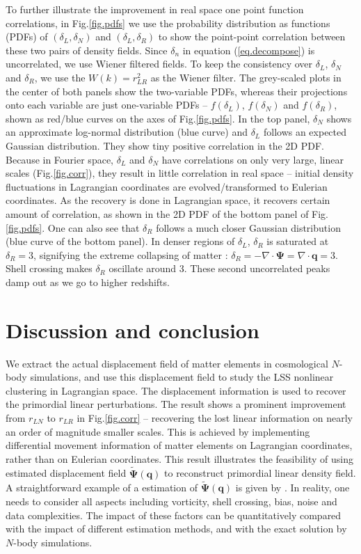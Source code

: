 \documentclass[aps,prd,twocolumn,superscriptaddress,amsfont,amssymb,amsmath,nofootinbib,showpacs,balancelastpage]{revtex4-1}
\newcommand{\bs}{\boldsymbol}
\begin{document}
To further illustrate the improvement in real space
one point function correlations,
in Fig.\ref{fig.pdfs} we use the probability distribution
as functions (PDFs) of $(\delta_L,\delta_N)$ and $(\delta_L,\delta_R)$
to show the point-point correlation between these two pairs of density
fields. Since $\delta_n$ in equation (\ref{eq.decompose}) is
uncorrelated, we use Wiener filtered fields. To keep the
consistency over $\delta_L$, $\delta_N$ and $\delta_R$, we
use the $W(k)=r^2_{LR}$ as the Wiener filter.
The grey-scaled plots in the center of both panels show the two-variable PDFs,
whereas their projections onto each variable are just
one-variable PDFs -- $f(\delta_L)$, $f(\delta_N)$ and $f(\delta_R)$, shown
as red/blue curves on the axes of Fig.\ref{fig.pdfs}.
In the top panel, $\delta_N$ shows an approximate log-normal
distribution (blue curve) and $\delta_L$ follows an expected
Gaussian distribution. They show tiny positive correlation in the
2D PDF.
Because in Fourier space, $\delta_L$ and $\delta_N$ have
correlations on only very large, linear scales (Fig.\ref{fig.corr}),
they result in little correlation in real space -- initial density fluctuations
in Lagrangian coordinates are evolved/transformed to Eulerian coordinates.
As the recovery is done in Lagrangian space, it recovers
certain amount of correlation, as shown in the 2D PDF of the bottom panel
of Fig.\ref{fig.pdfs}. One can also see that $\delta_R$ follows
a much closer Gaussian distribution (blue curve of the bottom panel).
In denser regions of $\delta_L$, $\delta_R$ is saturated at
$\delta_R=3$, signifying the extreme collapsing of matter \citep{2013MNRAS.428..141N}:
$\delta_R=-\nabla\cdot\bs\Psi=\nabla\cdot\bs q=3$. Shell crossing
makes $\delta_R$ oscillate around 3. These second uncorrelated peaks
damp out as we go to higher redshifts.



\section{Discussion and conclusion}\label{sec.discussion}
We extract the actual displacement field of matter elements in cosmological $N$-body
simulations, and use this displacement field to study the LSS nonlinear
clustering in Lagrangian space. The displacement information is used to recover
the primordial linear perturbations. The result shows a prominent improvement from
$r_{LN}$ to $r_{LR}$ in Fig.\ref{fig.corr} -- recovering the lost linear information on
nearly an order of magnitude smaller scales.
This is achieved by implementing differential movement information
of matter elements on Lagrangian coordinates, rather than on
Eulerian coordinates. This result illustrates the feasibility
of using estimated displacement field $\tilde{\bs \Psi}(\bs q)$
to reconstruct primordial linear density field.
A straightforward example of a estimation of $\tilde{\bs \Psi}(\bs q)$
is given by \cite{1995ApJS..100..269P,1998ApJS..115...19P}.
In reality, one needs
to consider all aspects including vorticity, shell crossing, bias, noise
and data complexities. The impact of these factors can be quantitatively
compared with the impact of different estimation methods, and with
the exact solution by $N$-body simulations.
\end{document}
